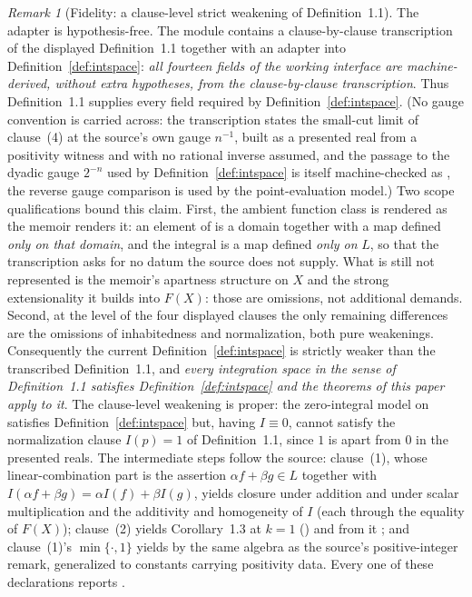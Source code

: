\documentclass[11pt]{article}
\theoremstyle{definition}
\theoremstyle{remark}
\newtheorem{remark}[theorem]{Remark}
\begin{document}
\begin{remark}[Fidelity: a clause-level strict weakening of Definition~1.1]
The adapter is hypothesis-free.  The module  contains a clause-by-clause transcription  of the displayed Definition~1.1 together with an adapter  into Definition~\ref{def:intspace}: \emph{all fourteen fields of the working interface are machine-derived, without extra hypotheses, from the clause-by-clause transcription}.  Thus Definition~1.1 supplies every field required by Definition~\ref{def:intspace}.  (No gauge convention is carried across: the transcription states the small-cut limit of clause~(4) at the source's own gauge $n^{-1}$, built as a presented real from a positivity witness and with no rational inverse assumed, and the passage to the dyadic gauge $2^{-n}$ used by Definition~\ref{def:intspace} is itself machine-checked as , the reverse gauge comparison  is used by the point-evaluation model.)  Two scope qualifications bound this claim.  First, the ambient function class is rendered as the memoir renders it: an element of  is a domain together with a map defined \emph{only on that domain}, and the integral is a map defined \emph{only on} $L$, so that the transcription asks for no datum the source does not supply.  What is still not represented is the memoir's apartness structure on $X$ and the strong extensionality it builds into $F(X)$: those are omissions, not additional demands.  Second, at the level of the four displayed clauses the only remaining differences are the omissions of inhabitedness and normalization, both pure weakenings.  Consequently the current Definition~\ref{def:intspace} is strictly weaker than the transcribed Definition~1.1, and \emph{every integration space in the sense of Definition~1.1 satisfies Definition~\ref{def:intspace} and the theorems of this paper apply to it}.  The clause-level weakening is proper: the zero-integral model on  satisfies Definition~\ref{def:intspace} but, having $I\equiv 0$, cannot satisfy the normalization clause $I(p)=1$ of Definition~1.1, since $1$ is apart from $0$ in the presented reals.  The intermediate steps follow the source: clause~(1), whose linear-combination part is the assertion $\alpha f+\beta g\in L$ together with $I(\alpha f+\beta g)=\alpha I(f)+\beta I(g)$, yields closure under addition and under scalar multiplication and the additivity and homogeneity of $I$ (each through the equality of $F(X)$); clause~(2) yields Corollary~1.3 at $k=1$ () and from it ; and clause~(1)'s $\min\{\cdot,1\}$ yields  by the same algebra as the source's positive-integer remark, generalized to constants carrying positivity data.  Every one of these declarations reports .


\end{remark}
\end{document}
